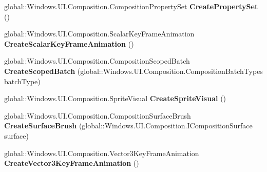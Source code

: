 \begin{DoxyCompactItemize}
\mbox{\label{interface_windows_1_1_u_i_1_1_composition_1_1_i_compositor_a65caaced591df89e953360feef3dc21c}} 
global\+::\+Windows.\+U\+I.\+Composition.\+Composition\+Property\+Set {\bfseries Create\+Property\+Set} ()
\item 
\mbox{\label{interface_windows_1_1_u_i_1_1_composition_1_1_i_compositor_a0fbfc1dc456d3dee8d1faf78bfe40c9a}} 
global\+::\+Windows.\+U\+I.\+Composition.\+Scalar\+Key\+Frame\+Animation {\bfseries Create\+Scalar\+Key\+Frame\+Animation} ()
\item 
\mbox{\label{interface_windows_1_1_u_i_1_1_composition_1_1_i_compositor_ace9715f39dc12e329752515c931e5b77}} 
global\+::\+Windows.\+U\+I.\+Composition.\+Composition\+Scoped\+Batch {\bfseries Create\+Scoped\+Batch} (global\+::\+Windows.\+U\+I.\+Composition.\+Composition\+Batch\+Types batch\+Type)
\item 
\mbox{\label{interface_windows_1_1_u_i_1_1_composition_1_1_i_compositor_adcaefeb1c16a19b1a8bf373e365eab4e}} 
global\+::\+Windows.\+U\+I.\+Composition.\+Sprite\+Visual {\bfseries Create\+Sprite\+Visual} ()
\item 
\mbox{\label{interface_windows_1_1_u_i_1_1_composition_1_1_i_compositor_a9dce8b6100f7776e8c934df2a289924e}} 
global\+::\+Windows.\+U\+I.\+Composition.\+Composition\+Surface\+Brush {\bfseries Create\+Surface\+Brush} (global\+::\+Windows.\+U\+I.\+Composition.\+I\+Composition\+Surface surface)
\item 
\mbox{\label{interface_windows_1_1_u_i_1_1_composition_1_1_i_compositor_a7cda6336654224115f835339f7968fb1}} 
global\+::\+Windows.\+U\+I.\+Composition.\+Vector3\+Key\+Frame\+Animation {\bfseries Create\+Vector3\+Key\+Frame\+Animation} ()
\item 
\mbox{\label{interface_windows_1_1_u_i_1_1_composition_1_1_i_compositor_a741d4bb0d7eef4b99352ca5c3f31e3ab}} 

\end{DoxyCompactItemize}
